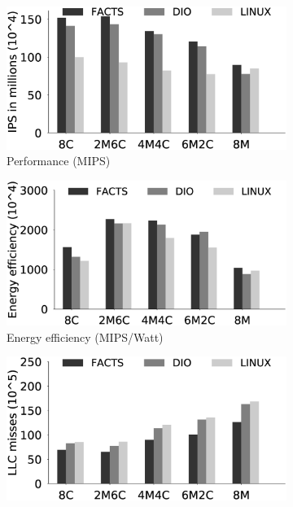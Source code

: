 \begin{figure}
   \centering
    \vspace{-4mm}
    \begin{subfigure}{.5\textwidth}
        \centering
        \includegraphics[width=\textwidth]{Chapter3/Figs/consolidation/perf.eps}
        \caption{Performance (MIPS)}
        \label{fig: perfmips}
    \end{subfigure}
    \begin{subfigure}{0.5\textwidth}
        \centering
        \includegraphics[width=\textwidth]{Chapter3/Figs/consolidation/ef.eps}
        \caption{Energy efficiency (MIPS/Watt)}
        \label{fig: Energy Efficiency}
    \end{subfigure}
    \begin{subfigure}{0.5\textwidth}
        \centering
        \includegraphics[width=\textwidth]{Chapter3/Figs/consolidation/llc.eps}

\end{subfigure}
\end{figure}
